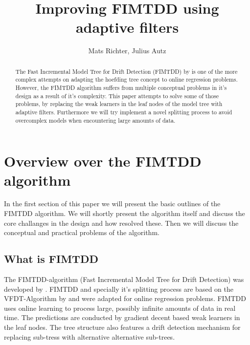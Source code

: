 \documentclass[a4paper,pt12]{article}
\begin{document}
\author{Mats Richter, Julius Autz}
\title{Improving FIMTDD using adaptive filters}


\maketitle

\begin{abstract}
The Fast Incremental Model Tree for Drift Detection (FIMTDD) by \cite{fimtdd} is one of the more complex attempts on adapting the hoefding tree concept to online regression problems. However, the FIMTDD algorithm suffers from multiple conceptual problems in it's design as a result of it's complexity. This paper attempts to solve some of those problems, by replacing the weak learners in the leaf nodes of the model tree with adaptive filters. Furthermore we will try implement a novel splitting process to avoid overcomplex models when encountering large amounts of data.

\end{abstract}

\section{Overview over the FIMTDD algorithm}
In the first section of this paper we will present the basic outlines of the FIMTDD algorithm. We will shortly present the algorithm itself and discuss the core challanges in the design and how \cite{fimtdd} resolved these. Then we will discuss the conceptual and practical problems of the algorithm. 

\subsection{What is FIMTDD}
The FIMTDD-algorithm (Fast Incremental Model Tree for Drift Detection) was developed by \cite{fimtdd}. FIMTDD and specially it's splitting process are based on the VFDT-Algorithm by \cite{miningHulten} and  were adapted for online regression problems. FIMTDD uses online learning to process large, possibly infinite amounts of data in real time. The predictions are conducted by gradient decent based weak learners in the leaf nodes. The tree structure also features a drift detection mechanism for replacing sub-tress with alternative alternative sub-trees.\newline
\end{document}
